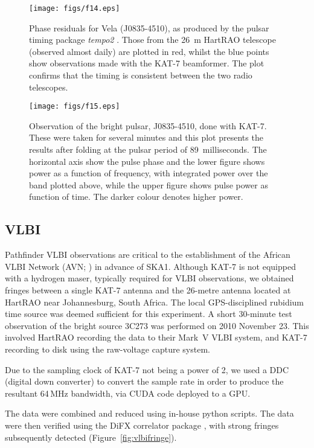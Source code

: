 \begin{figure}
\texttt{[image: figs/f14.eps]} 
\caption{Phase residuals for Vela (\mbox{J0835-4510}), as produced by
  the pulsar timing package \emph{tempo2} \citep{hobbs}. Those from
  the 26~m HartRAO telescope (observed almost daily) are plotted in
  red, whilst the blue points show observations made with the KAT-7
  beamformer.  The plot confirms that the timing is consistent between
  the two radio telescopes.}
\label{fig:pulsarspec}
\end{figure}

\begin{figure}
\texttt{[image: figs/f15.eps]} 
\caption{Observation of the bright pulsar, \mbox{J0835-4510}, done
  with KAT-7. These were taken for several minutes and this plot
  presents the results after folding at the pulsar period of
  89~milliseconds. The horizontal axis show the pulse phase and the
  lower figure shows power as a function of frequency, with integrated
  power over the band plotted above, while the upper figure shows
  pulse power as function of time. The darker colour denotes higher
  power.}
\label{fig:pulsarfold}
\end{figure}


\subsection{VLBI}

\noindent
Pathfinder VLBI observations are critical to the establishment of the
African VLBI Network (AVN; \citealt{gaylard}) in advance of SKA1.
Although KAT-7 is not equipped with a hydrogen maser, typically
required for VLBI observations, we obtained fringes between a single
KAT-7 antenna and the 26-metre antenna located at HartRAO near
Johannesburg, South Africa. The local GPS-disciplined rubidium time
source was deemed sufficient for this experiment.  A short 30-minute
test observation of the bright source 3C273 was performed on 2010
November 23. This involved HartRAO recording the data to their Mark~V
VLBI system, and KAT-7 recording to disk using the raw-voltage capture
system.

Due to the sampling clock of KAT-7 not being a power of 2, we used a
DDC (digital down converter) to convert the sample rate in order to
produce the resultant 64\,MHz bandwidth, via CUDA code deployed to a
GPU.
 
The data were combined and reduced using in-house python scripts. The
data were then verified using the DiFX correlator package
\citep{Deller}, with strong fringes subsequently detected
(Figure~\ref{fig:vlbifringe}).


